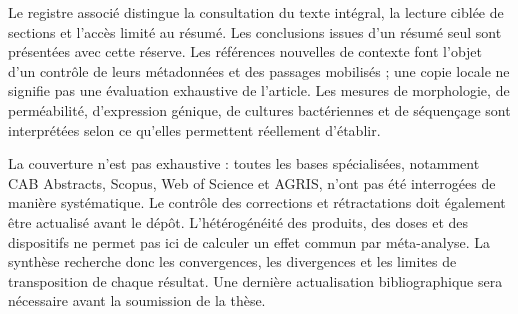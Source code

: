 Le registre associé distingue la consultation du texte intégral, la lecture ciblée de sections et l'accès limité au résumé. Les conclusions issues d'un résumé seul sont présentées avec cette réserve. Les références nouvelles de contexte font l'objet d'un contrôle de leurs métadonnées et des passages mobilisés ; une copie locale ne signifie pas une évaluation exhaustive de l'article. Les mesures de morphologie, de perméabilité, d'expression génique, de cultures bactériennes et de séquençage sont interprétées selon ce qu'elles permettent réellement d'établir.

La couverture n'est pas exhaustive : toutes les bases spécialisées, notamment CAB Abstracts, Scopus, Web of Science et AGRIS, n'ont pas été interrogées de manière systématique. Le contrôle des corrections et rétractations doit également être actualisé avant le dépôt. L'hétérogénéité des produits, des doses et des dispositifs ne permet pas ici de calculer un effet commun par méta-analyse. La synthèse recherche donc les convergences, les divergences et les limites de transposition de chaque résultat. Une dernière actualisation bibliographique sera nécessaire avant la soumission de la thèse.
